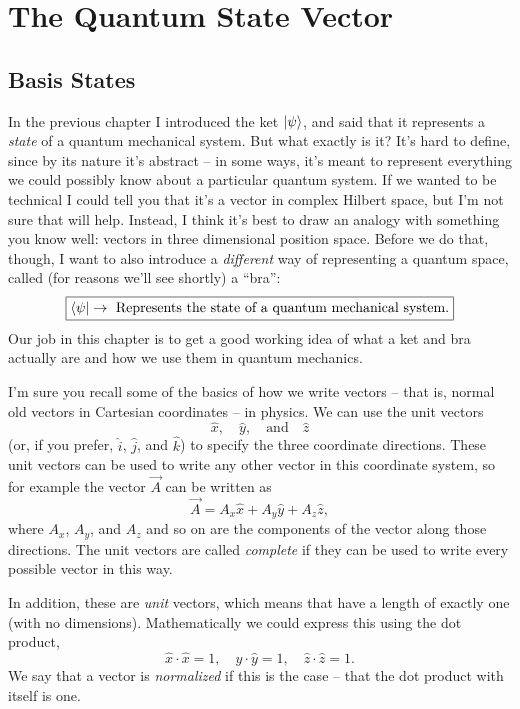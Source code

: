 \chapter{The Quantum State Vector}

\section{Basis States}

In the previous chapter I introduced the ket $| \psi \rangle$, and said that it represents a \emph{state} of a quantum mechanical system.  But what exactly is it?  It's hard to define, since by its nature it's abstract -- in some ways, it's meant to represent everything we could possibly know about a particular quantum system.  If we wanted to be technical I could tell you that it's a vector in complex Hilbert space, but I'm not sure that will help. Instead, I think it's best to draw an analogy with something you know well:  vectors in three dimensional position space.  Before we do that, though, I want to also introduce a \emph{different} way of representing a quantum space, called (for reasons we'll see shortly) a ``bra'':
\begin{equation}
\label{eq_bra_definition}
\boxed{
\langle \psi | \rightarrow \text{ Represents the state of a quantum mechanical system.}
}
\end{equation}
Our job in this chapter is to get a good working idea of what a ket and bra actually are and how we use them in quantum mechanics.

I'm sure you recall some of the basics of how we write vectors -- that is, normal old vectors in Cartesian coordinates -- in physics.  We can use the unit vectors
\[
\hat{x}, \quad \hat{y}, \quad \text{and} \quad \hat{z}
\]
(or, if you prefer, $\hat{i}$, $\hat{j}$, and $\hat{k}$) to specify the three coordinate directions.  These unit vectors can be used to write any other vector in this coordinate system, so for example the vector $\vec{A}$ can be written as
\[
\vec{A} = A_x \hat{x} + A_y \hat{y} + A_z \hat{z},
\]
where $A_x$, $A_y$, and $A_z$ and so on are the components of the vector along those directions.  The unit vectors are called \emph{complete} if they can be used to write every possible vector in this way.

In addition, these are \emph{unit} vectors, which means that have a length of exactly one (with no dimensions).  Mathematically we could express this using the dot product,
\[
\hat{x} \cdot \hat{x} = 1, \quad \hat{y} \cdot \hat{y} = 1, \quad \hat{z} \cdot \hat{z} = 1.
\]
We say that a vector is \emph{normalized} if this is the case -- that the dot product with itself is one.

